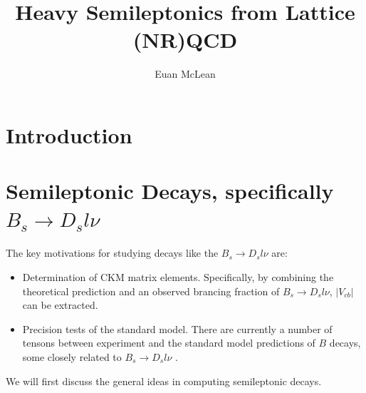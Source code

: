 \documentclass[a4paper,10pt]{article}
\title{Heavy Semileptonics from Lattice (NR)QCD }
\author{Euan McLean}
\numberwithin{equation}{section}
\begin{document}
\maketitle

\vspace{0.5cm}

\tableofcontents


\section{Introduction}

{}

\section{Semileptonic Decays, specifically $B_s \to D_s l \nu$}
\label{sec:semileptonic}

The key motivations for studying decays like the $B_s \to D_s l\nu$ are:
\begin{itemize}
	\item
	Determination of CKM matrix elements. Specifically, by combining the theoretical prediction and an observed brancing fraction of $B_s \to D_s l\nu$, $|V_{cb}|$ can be extracted.
	\item
	Precision tests of the standard model. There are currently a number of tensons between experiment and the standard model predictions of $B$ decays, some closely related to $B_s \to D_s l\nu$ \cite{Na:2015kha}.
\end{itemize}
We will first discuss the general ideas in computing semileptonic decays.
\end{document}
